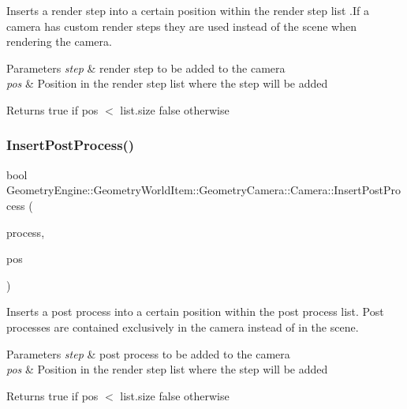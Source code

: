Inserts a render step into a certain position within the render step list .If a camera has custom render steps they are used instead of the scene when rendering the camera. 
\begin{DoxyParams}{Parameters}
{\em step} & render step to be added to the camera \\
\hline
{\em pos} & Position in the render step list where the step will be added \\
\hline
\end{DoxyParams}
\begin{DoxyReturn}{Returns}
true if pos $<$ list.\+size false otherwise 
\end{DoxyReturn}
\mbox{\label{class_geometry_engine_1_1_geometry_world_item_1_1_geometry_camera_1_1_camera_a6079f2bacb9134ca0c3d7e8a97993f8c}} 
\subsubsection{\texorpdfstring{InsertPostProcess()}{InsertPostProcess()}}
{\footnotesize\ttfamily bool Geometry\+Engine\+::\+Geometry\+World\+Item\+::\+Geometry\+Camera\+::\+Camera\+::\+Insert\+Post\+Process (\begin{DoxyParamCaption}\item[{const \mbox{\hyperlink{class_geometry_engine_1_1_geometry_post_process_1_1_post_process}{Geometry\+Post\+Process\+::\+Post\+Process}} \&}]{process,  }\item[{unsigned int}]{pos }\end{DoxyParamCaption})\hspace{0.3cm}{\ttfamily [virtual]}}

Inserts a post process into a certain position within the post process list. Post processes are contained exclusively in the camera instead of in the scene. 
\begin{DoxyParams}{Parameters}
{\em step} & post process to be added to the camera \\
\hline
{\em pos} & Position in the render step list where the step will be added \\
\hline
\end{DoxyParams}
\begin{DoxyReturn}{Returns}
true if pos $<$ list.\+size false otherwise 
\end{DoxyReturn}
\mbox{\label{class_geometry_engine_1_1_geometry_world_item_1_1_geometry_camera_1_1_camera_a48e1e7bfc2aea19d21ecf5a311815740}} 
